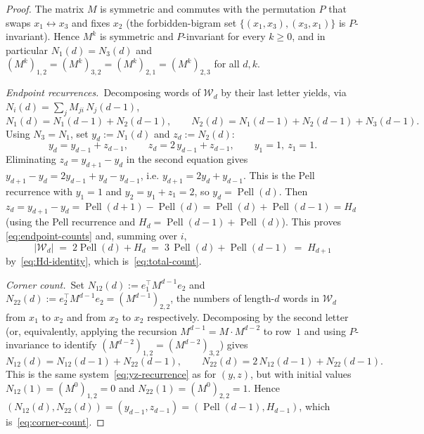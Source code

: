 \documentclass{amsart}
\theoremstyle{definition}
\theoremstyle{remark}
\DeclareMathOperator{\Pell}{Pell}
\begin{document}
\begin{proof}
The matrix $M$ is symmetric and commutes with the permutation
$P$ that swaps $x_1 \leftrightarrow x_3$ and fixes $x_2$
\textup{(}the forbidden-bigram set $\{(x_1, x_3), (x_3, x_1)\}$
is $P$-invariant\textup{)}.  Hence $M^k$ is symmetric and
$P$-invariant for every $k \ge 0$, and in particular
$N_1(d) = N_3(d)$ and $(M^k)_{1,2} = (M^k)_{3,2} = (M^k)_{2,1}
= (M^k)_{2,3}$ for all $d, k$.

\emph{Endpoint recurrences.}\ Decomposing words of $\mathcal{W}_d$
by their last letter yields, via $N_i(d) = \sum_{j} M_{ji}\, N_j(d-1)$,
\[
  N_1(d) = N_1(d-1) + N_2(d-1), \qquad
  N_2(d) = N_1(d-1) + N_2(d-1) + N_3(d-1).
\]
Using $N_3 = N_1$, set $y_d := N_1(d)$ and $z_d := N_2(d)$:
\begin{equation}\label{eq:yz-recurrence}
  y_d = y_{d-1} + z_{d-1}, \qquad z_d = 2\,y_{d-1} + z_{d-1},
  \qquad y_1 = 1,\ z_1 = 1.
\end{equation}
Eliminating $z_d = y_{d+1} - y_d$ in the second equation gives
$y_{d+1} - y_d = 2 y_{d-1} + y_d - y_{d-1}$, i.e.
$y_{d+1} = 2 y_d + y_{d-1}$.  This is the Pell recurrence with
$y_1 = 1$ and $y_2 = y_1 + z_1 = 2$, so $y_d = \Pell(d)$.  Then
$z_d = y_{d+1} - y_d = \Pell(d+1) - \Pell(d) = \Pell(d) +
\Pell(d-1) = H_d$ \textup{(}using the Pell recurrence and
$H_d = \Pell(d-1) + \Pell(d)$\textup{)}.  This proves
\eqref{eq:endpoint-counts} and, summing over $i$,
\[
  |\mathcal{W}_d| \;=\; 2 \Pell(d) + H_d
                 \;=\; 3\,\Pell(d) + \Pell(d-1)
                 \;=\; H_{d+1}
\]
by~\eqref{eq:Hd-identity}, which is~\eqref{eq:total-count}.

\emph{Corner count.}\ Set $N_{12}(d) := e_1^\top M^{d-1} e_2$ and
$N_{22}(d) := e_2^\top M^{d-1} e_2 = (M^{d-1})_{2,2}$, the numbers of
length-$d$ words in $\mathcal{W}_d$ from $x_1$ to $x_2$ and from
$x_2$ to $x_2$ respectively.  Decomposing by the second letter
\textup{(}or, equivalently, applying the recursion $M^{d-1} =
M \cdot M^{d-2}$ to row~$1$ and using $P$-invariance to identify
$(M^{d-2})_{1,2} = (M^{d-2})_{3,2}$\textup{)} gives
\[
  N_{12}(d) = N_{12}(d-1) + N_{22}(d-1), \qquad
  N_{22}(d) = 2\,N_{12}(d-1) + N_{22}(d-1).
\]
This is the same system~\eqref{eq:yz-recurrence} as for $(y, z)$,
but with initial values $N_{12}(1) = (M^0)_{1,2} = 0$ and
$N_{22}(1) = (M^0)_{2,2} = 1$.  Hence
$(N_{12}(d), N_{22}(d)) = (y_{d-1}, z_{d-1}) =
(\Pell(d-1), H_{d-1})$, which is~\eqref{eq:corner-count}.
\end{proof}
\end{document}
